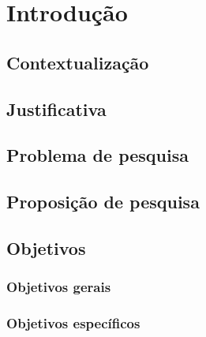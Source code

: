\documentclass[
	12pt,				%
	oneside,			%
	a4paper,			%
	english,			%
	brazil				%
	]{abntex2ppgsi}
\begin{document}
\tableofcontents*
\cleardoublepage



\textual



% 
%
%
\chapter{Introdução}

\section{Contextualização}

\section{Justificativa}

\section{Problema de pesquisa}

\section{Proposição de pesquisa}

\section{Objetivos}

\subsection{Objetivos gerais}

\subsection{Objetivos específicos}
\end{document}
